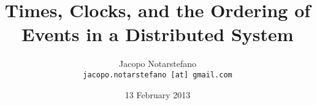 \documentclass[12pt]{beamer}
\title{Times, Clocks, and the Ordering of Events in a Distributed System}
\author[Jacopo Notarstefano]{
    Jacopo Notarstefano\\
    \texttt{jacopo.notarstefano [at] gmail.com}
}
\date{13 February 2013}
\begin{document}
    \begin{frame}[plain]
        \titlepage
    \end{frame}
\end{document}
